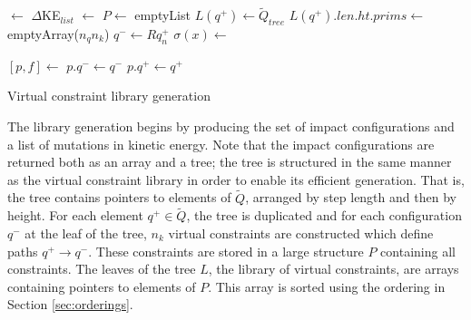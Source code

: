 \begin{algorithm}
\begin{algorithmic}[1]
		 $\gets$ 
		\State $\Delta$KE$_{list}$ $\gets$ 
		\State $P \gets$ emptyList
			\State $L(q^+) \gets \tilde{Q}_{tree}$
					\State $L(q^+).len.ht.prims \gets$ emptyArray($n_qn_k$)
						\State $q^- \gets Rq_n^+$
						\State $\sigma(x) \gets$ 
							
							\State $[p, f] \gets$ 
								\State $p.q^- \gets q^-$
								\State $p.q^+ \gets q^+$
								\State \Call{addToList}{$P, p$}
								\State {}
							\EndIf
						\EndFor
					\EndFor
					\State {}
				\EndFor
			\EndFor
		\EndFor
		\State {}
	\EndFunction
\end{algorithmic}
\caption{Virtual constraint library generation}
\label{alg:highlevellib}
\end{algorithm}

The library generation begins by producing the set of impact configurations and a list of mutations in kinetic energy. Note that the impact configurations are returned both as an array and a tree; the tree is structured in the same manner as the virtual constraint library in order to enable its efficient generation. That is, the tree contains pointers to elements of $\tilde{Q}$, arranged by step length and then by height. For each element $q^+ \in \tilde{Q}$, the tree is duplicated and for each configuration $q^-$ at the leaf of the tree, $n_k$ virtual constraints are constructed which define paths $q^+ \to q^-$. These constraints are stored in a large structure $P$ containing all constraints. The leaves of the tree $L$, the library of virtual constraints, are arrays containing pointers to elements of $P$. This array is sorted using the ordering in Section \ref{sec:orderings}. %

